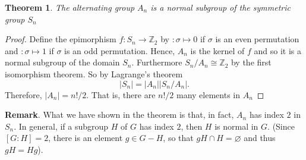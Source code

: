 \documentclass[12pt]{article}
\newtheorem{theorem}{Theorem}
\begin{document}
\begin{theorem}
 The alternating group $A_{n}$ is a normal subgroup of the symmetric group $S_{n}$
  \end{theorem}

\begin{proof}
Define the epimorphism $f:S_{n}\rightarrow\mathbb{Z}_2$ by
$:\sigma\mapsto 0$ if $\sigma$ is an even permutation and
$:\sigma\mapsto 1$ if $\sigma$ is an odd permutation.  Hence,
$A_{n}$ is the kernel of $f$ and so it is a normal subgroup of the
domain $S_{n}$. Furthermore $S_{n}/A_{n}\cong\mathbb{Z}_2$ by
the first isomorphism theorem. So by Lagrange's theorem
$$
\vert S_{n} \vert=\vert A_{n} \vert\vert S_{n}/A_{n}\vert.
$$
Therefore, $\vert A_{n}\vert=n!/2$. That is, there are $n!/2$ many
elements in $A_{n}$
\end{proof}

\textbf{Remark}.  What we have shown in the theorem is that, in fact, $A_n$ has index $2$ in $S_n$.  In general, if a subgroup $H$ of $G$ has index $2$, then $H$ is normal in $G$. (Since $[G:H]=2$, there is an element $g\in G-H$, so that $gH\cap H=\varnothing$ and thus $gH=Hg$).  
\end{document}
